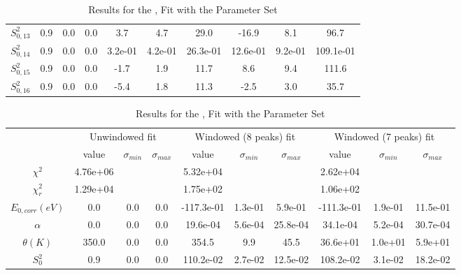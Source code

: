 \documentclass{article}
\begin{document}
\begin{landscape}
\begin{table}[ht]
\begin{tabular}{c|c|c|c|c|c|c|c|c|c}
$S^2_{0,13}$& 0.9 & 0.0 & 0.0 & 3.7 & 4.7 & 29.0 & -16.9 & 8.1 & 96.7 \\
$S^2_{0,14}$& 0.9 & 0.0 & 0.0 & 3.2e-01 & 4.2e-01 & 26.3e-01 & 12.6e-01 & 9.2e-01 & 109.1e-01 \\
$S^2_{0,15}$& 0.9 & 0.0 & 0.0 & -1.7 & 1.9 & 11.7 & 8.6 & 9.4 & 111.6 \\
$S^2_{0,16}$& 0.9 & 0.0 & 0.0 & -5.4 & 1.8 & 11.3 & -2.5 & 3.0 & 35.7 \\
\hline
    \end{tabular}
    \caption{Results for the ,  Fit with the  Parameter Set}
\end{table}
\begin{table}[ht]
\centering
\begin{tabular}{c|c|c|c|c|c|c|c|c|c}
\hline
&\multicolumn{3}{|c}{Unwindowed fit}&\multicolumn{3}{|c}{Windowed (8 peaks) fit}&\multicolumn{3}{|c}{Windowed (7 peaks) fit}\\
& value & $\sigma_{min}$ & $\sigma_{max}$& value & $\sigma_{min}$ & $\sigma_{max}$& value & $\sigma_{min}$ & $\sigma_{max}$\\
\hline
$\chi^2$   & 4.76e+06 & & & 5.32e+04 & & & 2.62e+04 & & \\
$\chi^2_r$ & 1.29e+04 & & & 1.75e+02 & & & 1.06e+02 & & \\
\hline
$E_{0,corr} (eV)$& 0.0 & 0.0 & 0.0 & -117.3e-01 & 1.3e-01 & 5.9e-01 & -111.3e-01 & 1.9e-01 & 11.5e-01 \\
$\alpha $       & 0.0 & 0.0 & 0.0 & 19.6e-04 & 5.6e-04 & 25.8e-04 & 34.1e-04 & 5.2e-04 & 30.7e-04 \\
$\theta (K) $   & 350.0 & 0.0 & 0.0 & 354.5 & 9.9 & 45.5 & 36.6e+01 & 1.0e+01 & 5.9e+01 \\
$S^2_{0}$& 0.9 & 0.0 & 0.0 & 110.2e-02 & 2.7e-02 & 12.5e-02 & 108.2e-02 & 3.1e-02 & 18.2e-02 \\
\hline
    \end{tabular}
    \caption{Results for the ,  Fit with the  Parameter Set}
\end{table}
\end{landscape}
\end{document}
